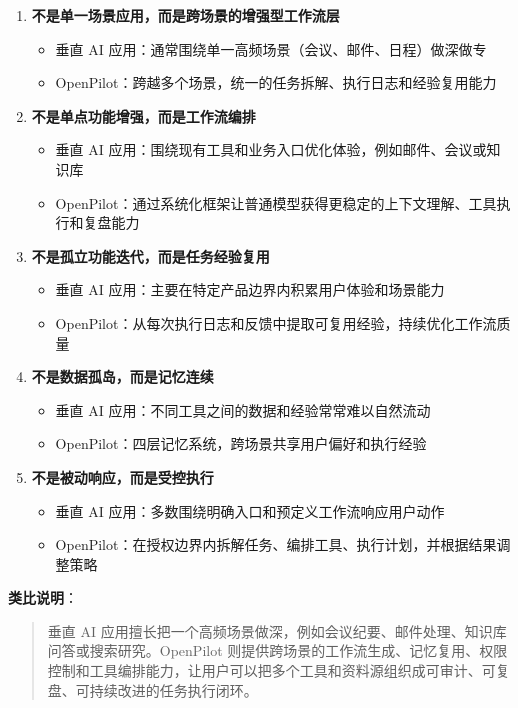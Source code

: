 \documentclass[12pt,a4paper]{ctexart}
\begin{document}
\begin{enumerate}
  \item \textbf{不是单一场景应用，而是跨场景的增强型工作流层}
  \begin{itemize}
    \item 垂直 AI 应用：通常围绕单一高频场景（会议、邮件、日程）做深做专
    \item OpenPilot：跨越多个场景，统一的任务拆解、执行日志和经验复用能力
  \end{itemize}

  \item \textbf{不是单点功能增强，而是工作流编排}
  \begin{itemize}
    \item 垂直 AI 应用：围绕现有工具和业务入口优化体验，例如邮件、会议或知识库
    \item OpenPilot：通过系统化框架让普通模型获得更稳定的上下文理解、工具执行和复盘能力
  \end{itemize}

  \item \textbf{不是孤立功能迭代，而是任务经验复用}
  \begin{itemize}
    \item 垂直 AI 应用：主要在特定产品边界内积累用户体验和场景能力
    \item OpenPilot：从每次执行日志和反馈中提取可复用经验，持续优化工作流质量
  \end{itemize}

  \item \textbf{不是数据孤岛，而是记忆连续}
  \begin{itemize}
    \item 垂直 AI 应用：不同工具之间的数据和经验常常难以自然流动
    \item OpenPilot：四层记忆系统，跨场景共享用户偏好和执行经验
  \end{itemize}

  \item \textbf{不是被动响应，而是受控执行}
  \begin{itemize}
    \item 垂直 AI 应用：多数围绕明确入口和预定义工作流响应用户动作
    \item OpenPilot：在授权边界内拆解任务、编排工具、执行计划，并根据结果调整策略
  \end{itemize}
\end{enumerate}

\textbf{类比说明}：

\begin{quote}
垂直 AI 应用擅长把一个高频场景做深，例如会议纪要、邮件处理、知识库问答或搜索研究。OpenPilot 则提供跨场景的工作流生成、记忆复用、权限控制和工具编排能力，让用户可以把多个工具和资料源组织成可审计、可复盘、可持续改进的任务执行闭环。
\end{quote}
\end{document}
